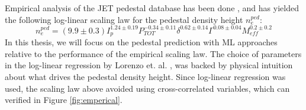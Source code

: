 \documentclass[a4paper, twoside, final, 12pt]{article}
\begin{document}
Empirical analysis of the JET pedestal database has been done \cite{Frassinetti_2020}, and has yielded the following log-linear scaling law for the pedestal density height $n_e^{ped}$:
\begin{equation} \label{eq:scaling}
	n_e^{ped} = (9.9 \pm 0.3) I_p^{1.24 \pm 0.19} P_{TOT}^{-0.34 \pm 0.11} \delta^{0.62 \pm 0.14} \Gamma^{ 0.08 \pm 0.04} M_{eff}^{0.2 \pm 0.2}
\end{equation}
In this thesis, we will focus on the pedestal prediction with ML approaches relative to the performance of the empirical scaling law.
The choice of parameters in the log-linear regression by Lorenzo et. al. \cite{Frassinetti_2020}, was backed by physical intuition about what drives the pedestal density height. Since log-linear regression was used, the scaling law above avoided using cross-correlated variables, which can verified in Figure \ref{fig:emperical}. 
\end{document}
